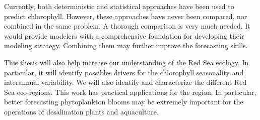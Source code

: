 Currently, both deterministic and statistical approaches have been used to
predict chlorophyll. However, these approaches have never been compared, nor
combined in the same problem. A thorough comparison is very much needed. It
would provide modelers with a comprehensive foundation for developing their
modeling strategy. Combining them may further improve the forecasting skills.

This thesis will also help increase our understanding of the Red Sea ecology.
In particular, it will identify possibles drivers for the chlorophyll
seasonality and interannual variability. We will also identify and characterize
the different Red Sea eco-regions. This work has practical applications for the
region. In particular, better forecasting phytoplankton blooms may be extremely
important for the operations of desalination plants and aquaculture.
